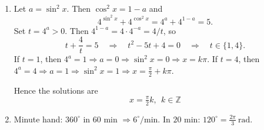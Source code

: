 \documentclass{article}
\begin{document}
\begin{enumerate}[label=\textbf{\arabic*.}, leftmargin=*, itemsep=0.6em]
  \item Let \(a=\sin^2 x\). Then \(\cos^2 x=1-a\) and
    \[
    4^{\sin^2 x}+4^{\cos^2 x}=4^{a}+4^{1-a}=5.
    \]
    Set \(t=4^{a}>0\). Then \(4^{1-a}=4\cdot 4^{-a}=4/t\), so
    \[
    t+\frac{4}{t}=5 \quad\Longrightarrow\quad t^2-5t+4=0
    \quad\Longrightarrow\quad t\in\{1,4\}.
    \]
    If \(t=1\), then \(4^{a}=1\Rightarrow a=0\Rightarrow \sin^2 x=0\Rightarrow x=k\pi\).
    If \(t=4\), then \(4^{a}=4\Rightarrow a=1\Rightarrow \sin^2 x=1\Rightarrow x=\frac{\pi}{2}+k\pi\).
    
    Hence the solutions are
    \[
    x=\tfrac{\pi}{2}k,\ \ k\in\mathbb{Z}
    \]

  \item Minute hand: \(360^\circ\) in \(60\) min \(\Rightarrow 6^\circ/\text{min}\).
        In \(20\) min: \(120^\circ=\frac{2\pi}{3}\ \text{rad}\).

\end{enumerate}
\end{document}
